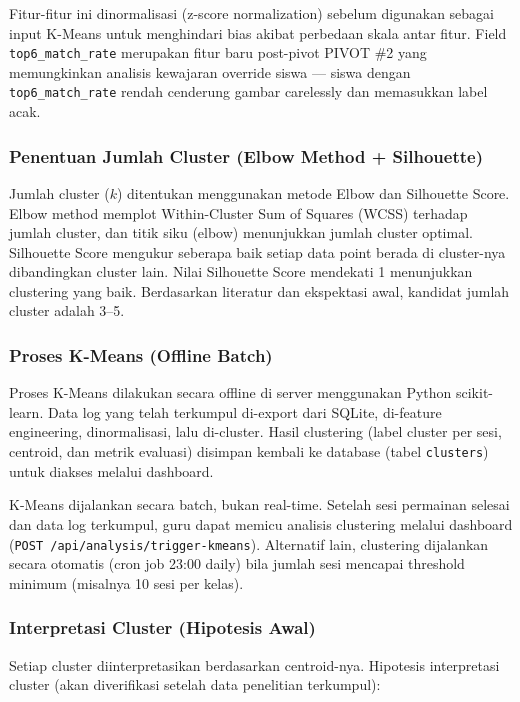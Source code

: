 \documentclass[12pt,a4paper,oneside,openany]{report}
\begin{document}
Fitur-fitur ini dinormalisasi (z-score normalization) sebelum digunakan sebagai input K-Means untuk menghindari bias akibat perbedaan skala antar fitur. Field \texttt{top6\_match\_rate} merupakan fitur baru post-pivot PIVOT \#2 yang memungkinkan analisis kewajaran override siswa --- siswa dengan \texttt{top6\_match\_rate} rendah cenderung gambar carelessly dan memasukkan label acak.

\subsubsection{Penentuan Jumlah Cluster (Elbow Method + Silhouette)}

Jumlah cluster ($k$) ditentukan menggunakan metode Elbow dan Silhouette Score. Elbow method memplot Within-Cluster Sum of Squares (WCSS) terhadap jumlah cluster, dan titik siku (elbow) menunjukkan jumlah cluster optimal. Silhouette Score mengukur seberapa baik setiap data point berada di cluster-nya dibandingkan cluster lain. Nilai Silhouette Score mendekati 1 menunjukkan clustering yang baik. Berdasarkan literatur dan ekspektasi awal, kandidat jumlah cluster adalah 3--5.

\subsubsection{Proses K-Means (Offline Batch)}

Proses K-Means dilakukan secara offline di server menggunakan Python scikit-learn. Data log yang telah terkumpul di-export dari SQLite, di-feature engineering, dinormalisasi, lalu di-cluster. Hasil clustering (label cluster per sesi, centroid, dan metrik evaluasi) disimpan kembali ke database (tabel \texttt{clusters}) untuk diakses melalui dashboard.

K-Means dijalankan secara batch, bukan real-time. Setelah sesi permainan selesai dan data log terkumpul, guru dapat memicu analisis clustering melalui dashboard (\texttt{POST /api/analysis/trigger-kmeans}). Alternatif lain, clustering dijalankan secara otomatis (cron job 23:00 daily) bila jumlah sesi mencapai threshold minimum (misalnya 10 sesi per kelas).

\subsubsection{Interpretasi Cluster (Hipotesis Awal)}

Setiap cluster diinterpretasikan berdasarkan centroid-nya. Hipotesis interpretasi cluster (akan diverifikasi setelah data penelitian terkumpul):
\end{document}
